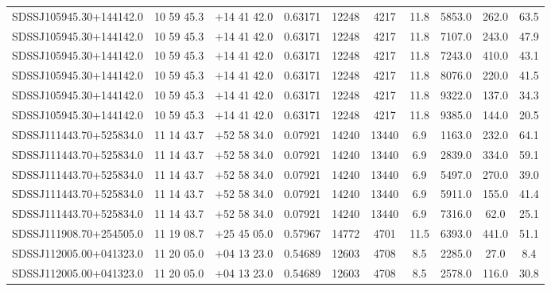 \begin{landscape}
\begin{center}
\begin{longtable}{l c c c c c c c c c}
SDSSJ105945.30+144142.0  & 10 59 45.3  &         $+$14 41 42.0  &       0.63171  & 12248  &   4217  &       11.8  &      5853.0  &  262.0  &  63.5  \\
SDSSJ105945.30+144142.0  & 10 59 45.3  &         $+$14 41 42.0  &       0.63171  & 12248  &   4217  &       11.8  &      7107.0  &  243.0  &  47.9  \\
SDSSJ105945.30+144142.0  & 10 59 45.3  &         $+$14 41 42.0  &       0.63171  & 12248  &   4217  &       11.8  &      7243.0  &  410.0  &  43.1  \\
SDSSJ105945.30+144142.0  & 10 59 45.3  &         $+$14 41 42.0  &       0.63171  & 12248  &   4217  &       11.8  &      8076.0  &  220.0  &  41.5  \\
SDSSJ105945.30+144142.0  & 10 59 45.3  &         $+$14 41 42.0  &       0.63171  & 12248  &   4217  &       11.8  &      9322.0  &  137.0  &  34.3  \\
SDSSJ105945.30+144142.0  & 10 59 45.3  &         $+$14 41 42.0  &       0.63171  & 12248  &   4217  &       11.8  &      9385.0  &  144.0  &  20.5  \\
SDSSJ111443.70+525834.0  & 11 14 43.7  &         $+$52 58 34.0  &       0.07921  & 14240  &   13440  &      6.9  &       1163.0  &  232.0  &  64.1  \\
SDSSJ111443.70+525834.0  & 11 14 43.7  &         $+$52 58 34.0  &       0.07921  & 14240  &   13440  &      6.9  &       2839.0  &  334.0  &  59.1  \\
SDSSJ111443.70+525834.0  & 11 14 43.7  &         $+$52 58 34.0  &       0.07921  & 14240  &   13440  &      6.9  &       5497.0  &  270.0  &  39.0  \\
SDSSJ111443.70+525834.0  & 11 14 43.7  &         $+$52 58 34.0  &       0.07921  & 14240  &   13440  &      6.9  &       5911.0  &  155.0  &  41.4  \\
SDSSJ111443.70+525834.0  & 11 14 43.7  &         $+$52 58 34.0  &       0.07921  & 14240  &   13440  &      6.9  &       7316.0  &  62.0  &   25.1  \\
SDSSJ111908.70+254505.0  & 11 19 08.7  &         $+$25 45 05.0  &       0.57967  & 14772  &   4701  &       11.5  &      6393.0  &  441.0  &  51.1  \\
SDSSJ112005.00+041323.0  & 11 20 05.0  &         $+$04 13 23.0  &       0.54689  & 12603  &   4708  &       8.5  &       2285.0  &  27.0  &   8.4  \\
SDSSJ112005.00+041323.0  & 11 20 05.0  &         $+$04 13 23.0  &       0.54689  & 12603  &   4708  &       8.5  &       2578.0  &  116.0  &  30.8  \\

\end{longtable}
\end{center}
\end{landscape}
